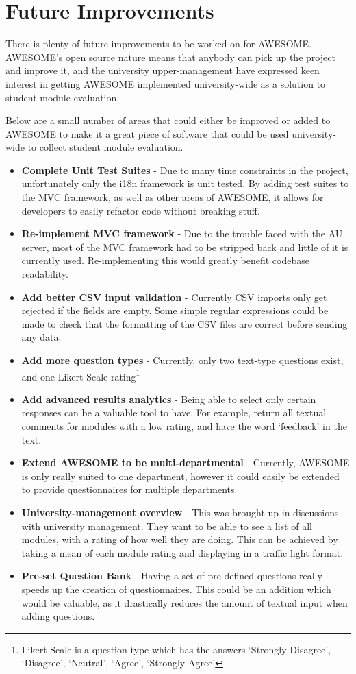 	\section{Future Improvements}
	\label{sec:futurescope}
	
	There is plenty of future improvements to be worked on for \ac{AWESOME}.
	\ac{AWESOME}'s open source nature means that anybody can pick up the project and improve it, and the university upper-management have expressed keen interest in getting \ac{AWESOME} implemented university-wide as a solution to student module evaluation.
	
	Below are a small number of areas that could either be improved or added to \ac{AWESOME} to make it a great piece of software that could be used university-wide to collect student module evaluation.
	
	\begin{itemize}
		\item \textbf{Complete Unit Test Suites} - Due to many time constraints in the project, unfortunately only the \ac{i18n} framework is unit tested. By adding test suites to the \ac{MVC} framework, as well as other areas of \ac{AWESOME}, it allows for developers to easily refactor code without breaking stuff.
		\item \textbf{Re-implement \ac{MVC} framework} - Due to the trouble faced with the \ac{AU} server, most of the \ac{MVC} framework had to be stripped back and little of it is currently used. Re-implementing this would greatly benefit codebase readability.
		\item \textbf{Add better CSV input validation} - Currently CSV imports only get rejected if the fields are empty. Some simple regular expressions could be made to check that the formatting of the CSV files are correct before sending any data.
		\item \textbf{Add more question types} - Currently, only two text-type questions exist, and one Likert Scale rating\footnote{Likert Scale is a question-type which has the answers `Strongly Disagree', `Disagree', `Neutral', `Agree', `Strongly Agree'}
		\item \textbf{Add advanced results analytics} - Being able to select only certain responses can be a valuable tool to have. For example, return all textual comments for modules with a low rating, and have the word `feedback' in the text.
		\item \textbf{Extend \ac{AWESOME} to be multi-departmental} - Currently, \ac{AWESOME} is only really suited to one department, however it could easily be extended to provide questionnaires for multiple departments.
		\item \textbf{University-management overview} - This was brought up in discussions with university management. They want to be able to see a list of all modules, with a rating of how well they are doing. This can be achieved by taking a mean of each module rating and displaying in a traffic light format.
		\item \textbf{Pre-set Question Bank} - Having a set of pre-defined questions really speeds up the creation of questionnaires. This could be an addition which would be valuable, as it drastically reduces the amount of textual input when adding questions.
	\end{itemize}
	